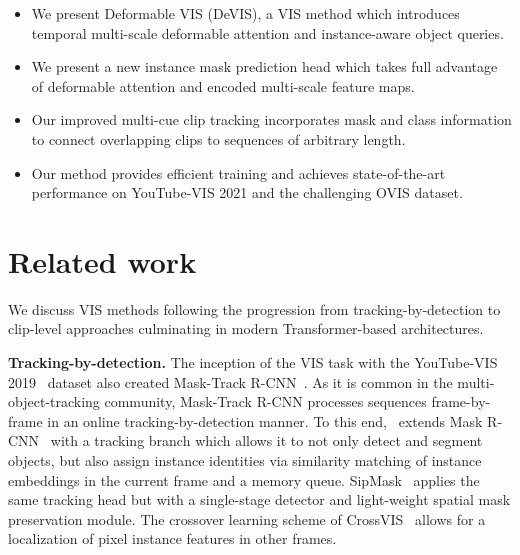 \documentclass[runningheads]{llncs}
\newcommand{\evis}{\mbox{DeVIS}}
\begin{document}
\begin{itemize}
\item We present Deformable VIS (\evis{}), a VIS method which introduces temporal multi-scale deformable attention and instance-aware object queries. 

\item We present a new instance mask prediction head which takes full advantage of deformable attention and encoded multi-scale feature maps.

\item Our improved multi-cue clip tracking incorporates mask and class information to connect overlapping clips to sequences of arbitrary length.

\item Our method provides efficient training and achieves state-of-the-art performance on YouTube-VIS 2021 and the challenging OVIS dataset. 

\end{itemize}




























%
 \section{Related work}

We discuss VIS methods following the progression from tracking-by-detection to clip-level approaches culminating in modern Transformer-based architectures.

\noindent \textbf{Tracking-by-detection.}
The inception of the VIS task with the YouTube-VIS 2019~\cite{Yang2019vis} dataset also created Mask-Track R-CNN~\cite{Yang2019vis}.
As it is common in the multi-object-tracking community, Mask-Track R-CNN processes sequences frame-by-frame in an online tracking-by-detection manner.
To this end,~\cite{Yang2019vis} extends Mask R-CNN~\cite{he2017mask} with a tracking branch which allows it to not only detect and segment objects, but also assign instance identities via similarity matching of instance embeddings in the current frame and a memory queue.
SipMask~\cite{sip_mask} applies the same tracking head but with a single-stage detector and light-weight spatial mask preservation module.
The crossover learning scheme of CrossVIS~\cite{cross_vis} allows for a localization of pixel instance features in other frames.
\end{document}
